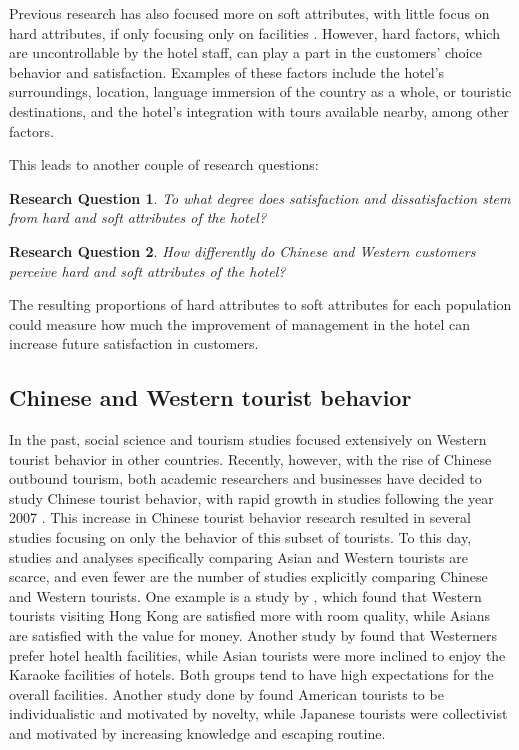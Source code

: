 \documentclass[smallextended,natbib]{svjour3}       %
\makeatletter
\newtheorem{rsq}{Research Question}
\newcounter{subrsq}
\newenvironment{subrsq}
         {%
          \setcounter{subrsq}{0}%
          \stepcounter{rsq}%
          \edef\saved@rsq{\thersq}%
          \let\c@rsq\c@subrsq     %
          \renewcommand{\thersq}{\saved@rsq\alph{rsq}}%
         }
         {}
\makeatother
\begin{document}
    Previous research has also focused more on soft attributes, with little focus on hard attributes, if only focusing only on facilities \cite[e.g.][]{shanka2004, choi2001}. However, hard factors, which are uncontrollable by the hotel staff, can play a part in the customers' choice behavior and satisfaction. Examples of these factors include the hotel's surroundings, location, language immersion of the country as a whole, or touristic destinations, and the hotel's integration with tours available nearby, among other factors. 

    This leads to another couple of research questions:

    \begin{subrsq}
    \begin{rsq}
    \label{rsq:hard_soft}
    To what degree does satisfaction and dissatisfaction stem from hard and soft attributes of the hotel?
    \end{rsq}

    \begin{rsq}
    \label{rsq:hard_soft_diff}
    How differently do Chinese and Western customers perceive hard and soft attributes of the hotel?
    \end{rsq}
    \end{subrsq}

    The resulting proportions of hard attributes to soft attributes for each population could measure how much the improvement of management in the hotel can increase future satisfaction in customers. 

  \subsection{Chinese and Western tourist behavior}\label{theory_zh_en}

    In the past, social science and tourism studies focused extensively on Western tourist behavior in other countries. Recently, however, with the rise of Chinese outbound tourism, both academic researchers and businesses have decided to study Chinese tourist behavior, with rapid growth in studies following the year 2007 \cite[][]{sun2017}. This increase in Chinese tourist behavior research resulted in several studies focusing on only the behavior of this subset of tourists. To this day, studies and analyses specifically comparing Asian and Western tourists are scarce, and even fewer are the number of studies explicitly comparing Chinese and Western tourists. One example is a study by \cite{choi2000}, which found that Western tourists visiting Hong Kong are satisfied more with room quality, while Asians are satisfied with the value for money. Another study by \cite{bauer1993changing} found that Westerners prefer hotel health facilities, while Asian tourists were more inclined to enjoy the Karaoke facilities of hotels. Both groups tend to have high expectations for the overall facilities. Another study done by \cite{kim2000} found American tourists to be individualistic and motivated by novelty, while Japanese tourists were collectivist and motivated by increasing knowledge and escaping routine.
\end{document}
